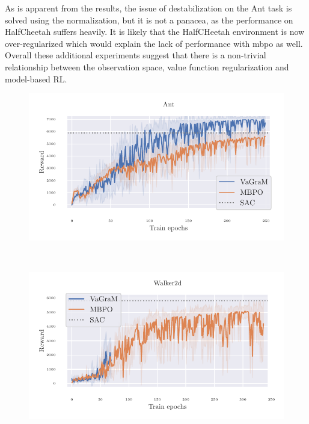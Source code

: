 As is apparent from the results, the issue of destabilization on the Ant task is solved using the normalization, but it is not a panacea, as the performance on HalfCheetah suffers heavily. 
It is likely that the HalfCHeetah environment is now over-regularized which would explain the lack of performance with \ac{mbpo} as well. Overall these additional experiments suggest that there is a non-trivial relationship between the observation space, value function regularization and model-based RL. 

\begin{figure}[t]
\begin{center}
\begin{minipage}{.49\textwidth}
    \centering
    \includegraphics[width=\textwidth]{figures/vagram/ant.pdf}
\end{minipage}~
\begin{minipage}{.49\textwidth}
    \centering
    \includegraphics[width=\textwidth]{figures/vagram/walker.pdf}
\end{minipage}
\end{center}


\end{figure}
